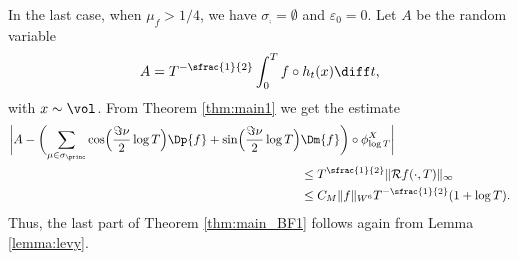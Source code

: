 In the last case, when $\mu_f > 1/4$, we have $\sigma_{\comp} = \emptyset$ and $\varepsilon_0=0$.
Let $A$ be the random variable
\[
A = T^{-\sfrac{1}{2}} \int_0^T f \circ h_t(x) \diff t,
\]
with $x \sim \vol$.
From Theorem \ref{thm:main1} we get the estimate
\begin{align*}
\biggl\lvert A - \biggl(\sum_{\mu \in \sigma_{\princ}} \cos\Bigl(\frac{\Im\nu}{2} \log T \Bigr) \Dp{ f} + \sin\Bigl(\frac{\Im\nu}{2} \log T \Bigr) &\Dm{ f} \biggr)\circ \phi^X_{\log T} \biggr\rvert\\
&\leq T^{\sfrac{1}{2}} \|\mathcal{R}f(\cdot, T) \|_{\infty} \\
& \leq C_M \|f\|_{W^6} T^{-\sfrac{1}{2}} (1+\log T).
\end{align*}
Thus, the last part of Theorem \ref{thm:main_BF1} follows again from Lemma \ref{lemma:levy}.

